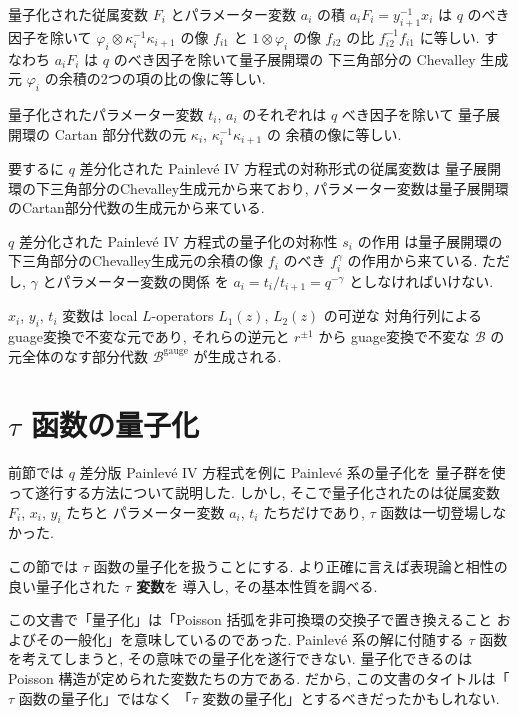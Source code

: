 \documentclass[12pt,twoside,dvipdfm]{msjproc}
\theoremstyle{definition} %
\theoremstyle{definition} %
\theoremstyle{definition} %
\numberwithin{theorem}{section}
\numberwithin{equation}{section}
\numberwithin{figure}{section}
\numberwithin{table}{section}
\newcommand\B{\mathcal{B}}
\newcommand\gauge{{\mathrm{gauge}}}
\begin{document}
量子化された従属変数 $F_i$ とパラメーター変数 $a_i$ の積 $a_i F_i = y_{i+1}^{-1}x_i$ 
は $q$ のべき因子を除いて $\varphi_i\otimes\kappa_i^{-1}\kappa_{i+1}$ の像 $f_{i1}$ 
と $1\otimes \varphi_i$ の像 $f_{i2}$ の比 $f_{i2}^{-1}f_{i1}$ に等しい. 
すなわち $a_i F_i$ は $q$ のべき因子を除いて量子展開環の
下三角部分の Chevalley 生成元 $\varphi_i$ の余積の2つの項の比の像に等しい.

量子化されたパラメーター変数 $t_i$, $a_i$ のそれぞれは $q$ べき因子を除いて
量子展開環の Cartan 部分代数の元 $\kappa_i$, $\kappa_i^{-1}\kappa_{i+1}$ の
余積の像に等しい.

要するに $q$ 差分化された Painlev\'e IV 方程式の対称形式の従属変数は
量子展開環の下三角部分のChevalley生成元から来ており,
パラメーター変数は量子展開環のCartan部分代数の生成元から来ている.

$q$ 差分化された Painlev\'e IV 方程式の量子化の対称性 $s_i$ の作用
は量子展開環の下三角部分のChevalley生成元の余積の像 $f_i$ のべき $f_i^\gamma$
の作用から来ている. ただし, $\gamma$ とパラメーター変数の関係
を $a_i=t_i/t_{i+1}=q^{-\gamma}$ としなければいけない.

$x_i$, $y_i$, $t_i$ 変数は local $L$-operators $L_1(z)$, $L_2(z)$ の可逆な
対角行列によるguage変換で不変な元であり, それらの逆元と $r^{\pm1}$ から
guage変換で不変な $\B$ の元全体のなす部分代数 $\B^\gauge$ が生成される.





\section{$\tau$ 函数の量子化}

前節では $q$ 差分版 Painlev\'e IV 方程式を例に Painlev\'e 系の量子化を
量子群を使って遂行する方法について説明した.
しかし, そこで量子化されたのは従属変数 $F_i$, $x_i$, $y_i$ たちと
パラメーター変数 $a_i$, $t_i$ たちだけであり, 
$\tau$ 函数は一切登場しなかった.

この節では $\tau$ 函数の量子化を扱うことにする.
より正確に言えば表現論と相性の良い量子化された {\bf $\tau$ 変数}を
導入し, その基本性質を調べる.

この文書で「量子化」は「Poisson 括弧を非可換環の交換子で置き換えること
およびその一般化」を意味しているのであった.
Painlev\'e 系の解に付随する $\tau$ 函数を考えてしまうと, 
その意味での量子化を遂行できない.
量子化できるのは Poisson 構造が定められた変数たちの方である.
だから, この文書のタイトルは「$\tau$ 函数の量子化」ではなく
「$\tau$ 変数の量子化」とするべきだったかもしれない.
\end{document}
